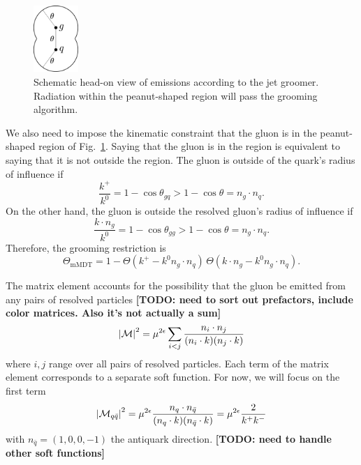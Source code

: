 \documentclass[11pt,twoside,reqno]{amsart}
\theoremstyle{plain}
\theoremstyle{remark}
\theoremstyle{definition}
\theoremstyle{remark}
\theoremstyle{definition}
\theoremstyle{definition}
\newcommand{\cM}{\mathcal{M}}
\newcommand{\mMDT}{\mathrm{mMDT}}
\begin{document}
	\begin{figure}\label{fig:schematic}
		\includegraphics[width=0.15\textwidth]{figures/head_on_schematic.pdf}
		\caption{Schematic head-on view of emissions according to the jet groomer. Radiation within the peanut-shaped region will pass the grooming algorithm.}
	\end{figure}

	We also need to impose the kinematic constraint that the gluon is in the peanut-shaped region of Fig.~\ref{fig:schematic}. Saying that the gluon is in the region is equivalent to saying that it is not outside the region. The gluon is outside of the quark's radius of influence if
	\begin{equation}
		\frac{k^+}{k^0} = 1 - \cos\theta_{gq} > 1 - \cos\theta = n_g \cdot n_q.
	\end{equation}
	On the other hand, the gluon is outside the resolved gluon's radius of influence if
	\begin{equation}
		\frac{k \cdot n_g}{k^0} = 1 - \cos\theta_{gg} > 1 - \cos\theta = n_g \cdot n_q.
	\end{equation}
	Therefore, the grooming restriction is
	\begin{equation}
		\Theta_{\mMDT} = 1 - \Theta(k^+ - k^0 n_g \cdot n_q)\,\Theta(k \cdot n_g - k^0 n_g \cdot n_q).
	\end{equation}

	The matrix element accounts for the possibility that the gluon be emitted from any pairs of resolved particles {\color{red}\textbf{[TODO: need to sort out prefactors, include color matrices. Also it's not actually a sum]}}
	\begin{equation}
		\abs{\cM}^2 = \mu^{2\epsilon}\sum_{i < j} \frac{n_i \cdot n_j}{(n_i \cdot k)(n_j \cdot k)}
	\end{equation}
	where $i, j$ range over all pairs of resolved particles. Each term of the matrix element corresponds to a separate soft function. For now, we will focus on the first term 
	\begin{equation}
		\abs{\cM_{q\bar q}}^2 = \mu^{2\epsilon}\frac{n_q \cdot n_{\bar q}}{(n_q \cdot k)(n_{\bar q}\cdot k)} = \mu^{2\epsilon}\frac{2}{k^+ k^-}
	\end{equation}
	with $n_{\bar q} = (1, 0, 0, -1)$ the antiquark direction. {\color{red}\textbf{[TODO: need to handle other soft functions]}}
\end{document}
